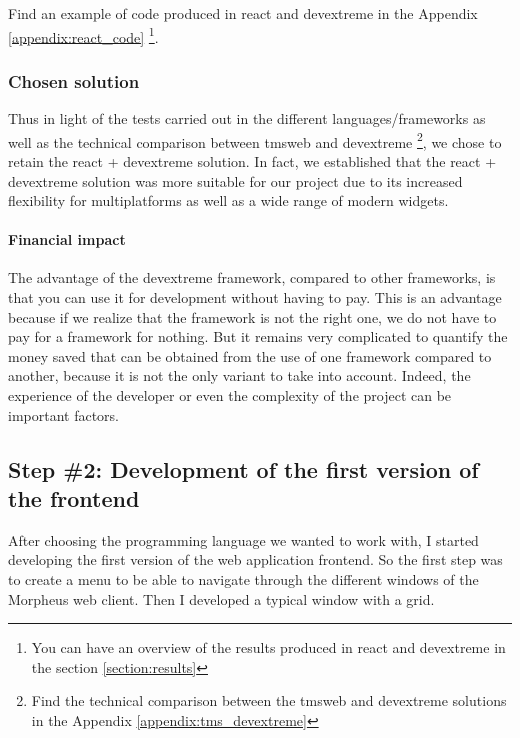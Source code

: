 \documentclass[a4paper, 12pt, french]{article}
\begin{document}
					\noindent Find an example of code produced in \gls{react} and \gls{devextreme} in the Appendix \ref{appendix:react_code} \footnote{You can have an overview of the results produced in \gls{react} and \gls{devextreme} in the section \ref{section:results} }.
		
						\subsubsection{Chosen solution}
							Thus in light of the tests carried out in the different languages/\glspl{framework} as well as the technical comparison between \gls{tmsweb} and \gls{devextreme} \footnote{Find the technical comparison between the \gls{tmsweb} and \gls{devextreme} solutions in the Appendix \ref{appendix:tms_devextreme} }, we chose to retain the \gls{react} + \gls{devextreme} solution. In fact, we established that the \gls{react} + \gls{devextreme} solution was more suitable for our project due to its increased flexibility for multiplatforms as well as a wide range of modern widgets.

							\paragraph{Financial impact\\}
								The advantage of the \gls{devextreme} \gls{framework}, compared to other \glspl{framework}, is that you can use it for development without having to pay. This is an advantage because if we realize that the \gls{framework} is not the right one, we do not have to pay for a \gls{framework} for nothing. But it remains very complicated to quantify the money saved that can be obtained from the use of one \gls{framework} compared to another, because it is not the only variant to take into account. Indeed, the experience of the developer or even the complexity of the project can be important factors.
					\newpage		
				\subsection{Step \#2: Development of the first version of the \gls{frontend}}
					After choosing the programming language we wanted to work with, I started developing the first version of the web application \gls{frontend}. So the first step was to create a menu to be able to navigate through the different windows of the Morpheus web client. Then I developed a typical window with a grid.\\
\end{document}
